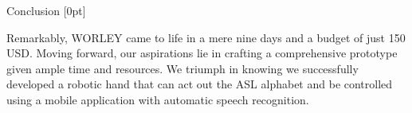\documentclass[final, 16pt]{beamer}
\newlength{\colwidth}
\begin{document}
\begin{frame}[t]
\begin{columns}[t]
\begin{column}{\colwidth}
\begin{block}{Conclusion}
    [0pt]

    Remarkably, WORLEY came to life in a mere nine days and a budget of just 150 USD. Moving forward, our aspirations lie in crafting a comprehensive prototype given ample time and resources. We triumph in knowing we successfully developed a robotic hand that can act out the ASL alphabet and be controlled using a mobile application with automatic speech recognition.

  \end{block}
\end{column}

\margincolumn
\end{columns}

\end{frame}
\end{document}
